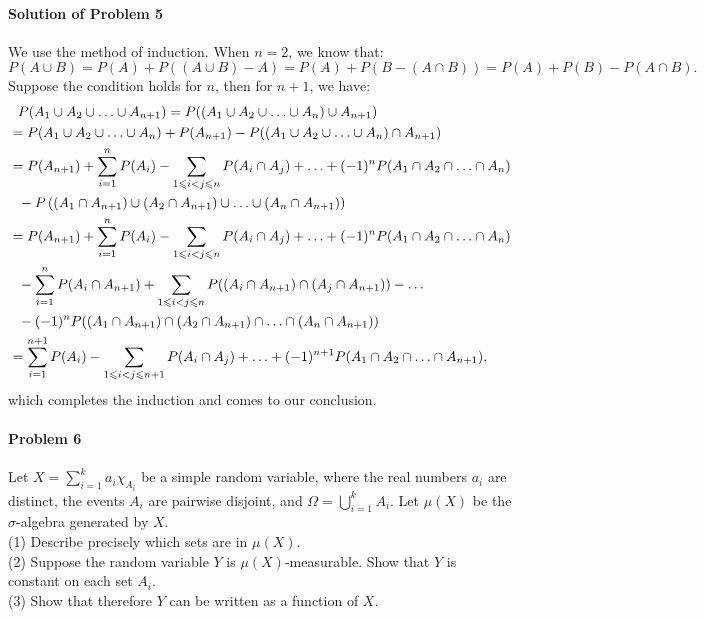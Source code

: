 \documentclass{article}
\begin{document}
\paragraph{Solution of Problem 5} We use the method of induction. When $n=2$, we know that:
\[P(A\cup B)=P(A)+P((A\cup B)-A)=P(A)+P(B-(A\cap B))=P(A)+P(B)-P(A\cap B).\]
Suppose the condition holds for $n$, then for $n+1$, we have:
\begin{align}
&~~P(A_1\cup A_2\cup\ldots\cup A_{n+1}) = P((A_1\cup A_2\cup\ldots\cup A_n)\cup A_{n+1})\notag\\
&= P(A_1\cup A_2\cup\ldots\cup A_n)+P(A_{n+1})-P((A_1\cup A_2\cup\ldots\cup A_n)\cap A_{n+1})\notag\\
&= P(A_{n+1})+\sum_{i=1}^{n} P(A_i) -\sum_{1\leqslant i<j\leqslant n}P(A_i\cap A_j)+\ldots+(-1)^n P(A_1\cap A_2\cap\ldots\cap A_n)\notag\\
&~~-P\left((A_1\cap A_{n+1})\cup (A_2\cap A_{n+1})\cup\ldots\cup (A_n\cap A_{n+1})\right)\notag\\
&= P(A_{n+1})+\sum_{i=1}^{n} P(A_i) -\sum_{1\leqslant i<j\leqslant n}P(A_i\cap A_j)+\ldots+(-1)^n P(A_1\cap A_2\cap\ldots\cap A_n)\notag\\
&~~-\sum_{i=1}^{n} P(A_i\cap A_{n+1})+\sum_{1\leqslant i<j\leqslant n}P((A_i\cap A_{n+1})\cap(A_j\cap A_{n+1}))-\ldots\notag\\
&~~-(-1)^n P((A_1\cap A_{n+1})\cap (A_2\cap A_{n+1})\cap\ldots\cap (A_n\cap A_{n+1}))\notag\\
&= \sum_{i=1}^{n+1} P(A_i) -\sum_{1\leqslant i<j\leqslant n+1}P(A_i\cap A_j)+\ldots+(-1)^{n+1} P(A_1\cap A_2\cap\ldots\cap A_{n+1})\notag,
\end{align}    
which completes the induction and comes to our conclusion. 

\paragraph{Problem 6} Let $X=\sum_{i=1}^{k}a_i\chi_{A_i}$ be a simple random variable, where the real numbers $a_i$ are distinct, the events $A_i$ are pairwise disjoint, and $\Omega=\bigcup_{i=1}^{k}A_i$. Let $\mu(X)$ be the $\sigma$-algebra generated by $X$.\\
(1) Describe precisely which sets are in $\mu(X)$.\\
(2) Suppose the random variable $Y$ is $\mu(X)$-measurable. Show that $Y$ is constant on each set $A_i$.\\
(3) Show that therefore $Y$ can be written as a function of $X$. 
\end{document}

